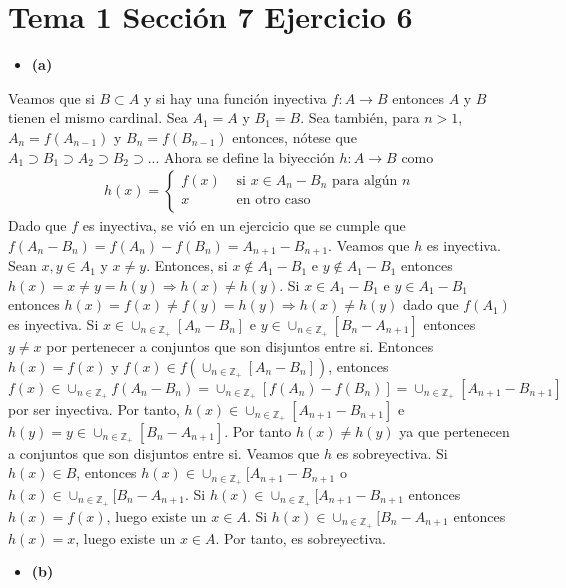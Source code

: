 \documentclass{article}
\begin{document}
\section{Tema 1 Sección 7 Ejercicio 6}
\begin{itemize}
\item \bf (a) \rm
\end{itemize}
Veamos que si $B\subset A$ y si  hay una función inyectiva $f:A\rightarrow B$ entonces $A$ y $B$ tienen el mismo cardinal.
Sea $A_1=A$ y $B_1=B$. Sea también, para $n>1$, $A_n=f(A_{n-1})$ y $B_n=f(B_{n-1})$ entonces, nótese que $A_1\supset B_1\supset A_2\supset B_2 \supset ...$ Ahora se define la biyección $h:A\rightarrow B$ como
\begin{eqnarray}
h(x)=\begin{cases}
f(x) & \text{ si }x\in A_n-B_n \text{ para algún }n\\
x & \text{ en otro caso }\nonumber\\
\end{cases}
\end{eqnarray}
Dado que $f$ es inyectiva, se vió en un ejercicio que se cumple que $f(A_n-B_n)=f(A_n)-f(B_n)=A_{n+1}-B_{n+1}$. Veamos que $h$ es inyectiva. Sean $x,y\in A_1$ y $x\neq y $. Entonces, si $x\notin A_1-B_1$ e  $y\notin A_1-B_1$ entonces $h(x)=x\neq y=h(y)\Rightarrow  h(x)\neq h(y)$. Si  $x\in A_1-B_1$ e  $y\in A_1-B_1$ entonces $h(x)=f(x)\neq f(y) =h(y)\Rightarrow  h(x)\neq h(y)$ dado que $f(A_1)$ es inyectiva. Si $x\in\cup_{n\in \mathbb{Z}_{+}}[A_n-B_n]$ e  $y\in \cup_{n\in \mathbb{Z}_{+}}[B_n-A_{n+1}]$ entonces $y\neq x$ por pertenecer a conjuntos que son disjuntos entre si. Entonces $h(x)=f(x)$ y $f(x)\in f(\cup_{n\in \mathbb{Z}_{+} }[A_n-B_n])$, entonces $f(x)\in\cup_{n\in \mathbb{Z}_{+}}f(A_n-B_n)=\cup_{n\in \mathbb{Z}_{+}}[f(A_n)-f(B_n)]=\cup_{n\in \mathbb{Z}_{+}}[A_{n+1}-B_{n+1}]$ por ser inyectiva. Por tanto, $h(x)\in\cup_{n\in \mathbb{Z}_{+}}[A_{n+1}-B_{n+1}]$ e $h(y)=y\in\cup_{n\in \mathbb{Z}_{+}}[B_{n}-A_{n+1}]$. Por tanto $h(x)\neq h(y)$ ya que pertenecen a conjuntos que son disjuntos entre si. Veamos que $h$ es sobreyectiva. Si $h(x)\in B$, entonces $h(x)\in \cup_{n\in \mathbb{Z}_{+}}[A_{n+1}-B_{n+1}$ o $h(x)\in \cup_{n\in \mathbb{Z}_{+}}[B_{n}-A_{n+1}$. Si  $h(x)\in \cup_{n\in \mathbb{Z}_{+}}[A_{n+1}-B_{n+1}$ entonces $h(x)=f(x)$, luego existe un $x\in A$. Si $h(x)\in \cup_{n\in \mathbb{Z}_{+}}[B_{n}-A_{n+1}$ entonces $h(x)=x$, luego existe un $x\in A$. Por tanto, es sobreyectiva.
 \begin{itemize}
\item \bf (b) \rm
\end{itemize}
\end{document}

